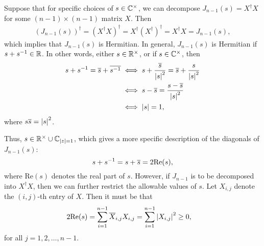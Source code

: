






Suppose that for specific choices of $s\in\mathbb{C}^\times$, we can decompose $J_{n-1}(s) = X^\dagger X$ for some $(n-1)\times(n-1)$ matrix $X$. Then
\begin{align}
    {\left( J_{n-1}(s) \right)}^\dagger = {\left( X^\dagger X \right)}^\dagger = X^\dagger {\left( X^\dagger \right)}^\dagger = X^\dagger X = J_{n-1}(s),
\end{align}
which implies that $J_{n-1}(s)$ is Hermitian. In general, $J_{n-1}(s)$ is Hermitian if $s+{ s }^{-1}\in\mathbb{R}$. In other words, either $s\in\mathbb{R}^\times$, or if $s\in\mathbb{C}^\times$, then
\begin{align}
    \begin{split}        
    s+{ s }^{-1} = \overline{s}+\overline{{ s }^{-1}} &\iff s+\frac{\overline{s}}{\left|s\right|^2} = \overline{s}+\frac{s}{\left|s\right|^2} \\
    &\iff s-\overline{s} = \frac{s-\overline{s}}{\left|s\right|^2} \\
    &\iff \left|s\right| = 1,
    \end{split}
\end{align}
where $s\overline{s}=\left|s\right|^2$. 

Thus, $s\in\mathbb{R}^\times\cup\mathbb{C}_{\left|z\right|=1}$, which gives a more specific description of the diagonals of $J_{n-1}(s)$:
\begin{equation}
    s+{ s }^{-1} = s+\overline{s} = 2\textrm{Re}(s),
\end{equation}
where $\textrm{Re}(s)$ denotes the real part of $s$. However, if $J_{n-1}$ is to be decomposed into $X^\dagger X$, then we can further restrict the allowable values of $s$. Let $X_{i,j}$ denote the $(i,j)$-th entry of $X$. Then it must be that
\begin{align}
    2\textrm{Re}(s) &= \sum_{i=1}^{n-1}\overline{X}_{i,j} X_{i,j} = \sum_{i=1}^{n-1}\left|X_{i,j}\right|^2 \geq 0,
\end{align}
for all $j=1,2,\dots,n-1$.

